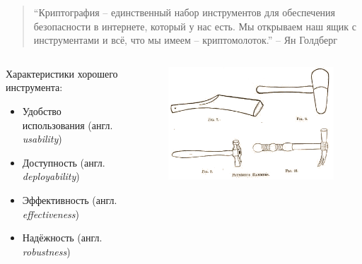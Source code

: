 \documentclass[presentation]{beamer}
\begin{document}
\begin{frame}{}
  \begin{quote}
    ``Криптография -- единственный набор инструментов для обеспечения
    безопасности в интернете, который у нас есть.  Мы открываем наш
    ящик с инструментами и всё, что мы имеем -- криптомолоток.'' -- Ян Голдберг
\end{quote}

  \bigskip

  \begin{columns}
    \begin{column}{0.6\textwidth}

Характеристики хорошего инструмента:
\begin{itemize}
\item Удобство использования (англ. \textit{usability})
\item Доступность (англ. \textit{deployability})
\item Эффективность (англ. \textit{effectiveness})
\item Надёжность (англ. \textit{robustness})
\end{itemize}
    \end{column}
    \begin{column}{0.4\textwidth}
      \begin{figure}[htb]
        \centering
        \includegraphics[width=1.0\textwidth]{popularsciencemo09newy_0033.png}
      \end{figure}
      \end{column}
  \end{columns}
\end{frame}
\end{document}
